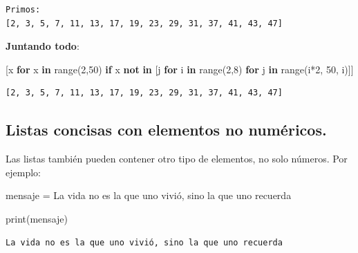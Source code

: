 \documentclass[
  spanish,
  letterpaper,
]{scrbook}
\newenvironment{Shaded}{\begin{snugshade}}{\end{snugshade}}
\newcommand{\BuiltInTok}[1]{\textcolor[rgb]{0.00,0.23,0.31}{#1}}
\newcommand{\ControlFlowTok}[1]{\textcolor[rgb]{0.00,0.23,0.31}{\textbf{#1}}}
\newcommand{\DecValTok}[1]{\textcolor[rgb]{0.68,0.00,0.00}{#1}}
\newcommand{\KeywordTok}[1]{\textcolor[rgb]{0.00,0.23,0.31}{\textbf{#1}}}
\newcommand{\NormalTok}[1]{\textcolor[rgb]{0.00,0.23,0.31}{#1}}
\newcommand{\OperatorTok}[1]{\textcolor[rgb]{0.37,0.37,0.37}{#1}}
\newcommand{\StringTok}[1]{\textcolor[rgb]{0.13,0.47,0.30}{#1}}
\theoremstyle{definition}
\theoremstyle{remark}
\begin{document}
\begin{verbatim}
Primos: 
[2, 3, 5, 7, 11, 13, 17, 19, 23, 29, 31, 37, 41, 43, 47]
\end{verbatim}

\textbf{Juntando todo}:

\begin{Shaded}
\begin{Highlighting}[]
\NormalTok{[x }\ControlFlowTok{for}\NormalTok{ x }\KeywordTok{in} \BuiltInTok{range}\NormalTok{(}\DecValTok{2}\NormalTok{,}\DecValTok{50}\NormalTok{) }\ControlFlowTok{if}\NormalTok{ x }\KeywordTok{not} \KeywordTok{in}\NormalTok{ [j }\ControlFlowTok{for}\NormalTok{ i }\KeywordTok{in} \BuiltInTok{range}\NormalTok{(}\DecValTok{2}\NormalTok{,}\DecValTok{8}\NormalTok{) }\ControlFlowTok{for}\NormalTok{ j }\KeywordTok{in} \BuiltInTok{range}\NormalTok{(i}\OperatorTok{*}\DecValTok{2}\NormalTok{, }\DecValTok{50}\NormalTok{, i)]]}
\end{Highlighting}
\end{Shaded}

\begin{verbatim}
[2, 3, 5, 7, 11, 13, 17, 19, 23, 29, 31, 37, 41, 43, 47]
\end{verbatim}

\subsection{Listas concisas con elementos no
numéricos.}\label{listas-concisas-con-elementos-no-numuxe9ricos.}

Las listas también pueden contener otro tipo de elementos, no solo
números. Por ejemplo:

\begin{Shaded}
\begin{Highlighting}[]
\NormalTok{mensaje }\OperatorTok{=} \StringTok{\textquotesingle{}La vida no es la que uno vivió, sino la que uno recuerda\textquotesingle{}}
\end{Highlighting}
\end{Shaded}

\begin{Shaded}
\begin{Highlighting}[]
\BuiltInTok{print}\NormalTok{(mensaje)}
\end{Highlighting}
\end{Shaded}

\begin{verbatim}
La vida no es la que uno vivió, sino la que uno recuerda
\end{verbatim}
\end{document}
